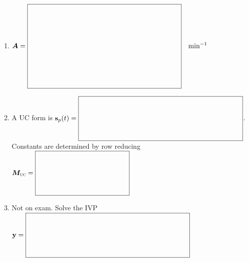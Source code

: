 \documentclass[11pt,letterpaper]{article}
\newcommand{\mat}[1]{\bm{#1}}
\newcommand{\SystemBlank}[2]{%
  \vcenter{\hbox{$\boxed{\rule{0pt}{#2}\makebox[#1]{}}$}}}
\newcommand{\VectorBlank}{\SystemBlank{3.2in}{0.80in}}
\newcommand{\MatrixBlank}{\SystemBlank{1.8in}{0.80in}}
\newcommand{\TrigMatrixBlank}{\SystemBlank{3.0in}{1.60in}}
\begin{document}
\begin{enumerate}
\begin{enumerate}
\noindent $\vect{v}(t)=\vcenter{\hbox{$\boxed{\parbox[c][0.80in][c]{1.6in}{\centering$\begin{pmatrix}50\\60\\40\end{pmatrix}$}}$}}\quad\mathrm{L}\qquad
\vect{b}=\SystemBlank{1.6in}{0.80in}\quad\mathrm{g/min}$
\item $\mat{A}=\TrigMatrixBlank\quad\mathrm{min}^{-1}$
\item A UC form is $\vect{s}_p(t)=\VectorBlank$. 
Constants are determined by row reducing
$\mat{M}_{\text{\textsc{uc}}}=\MatrixBlank$

\item Not on exam. Solve the IVP
$\vect{y} =\VectorBlank$
\end{enumerate}
\end{enumerate}
\end{document}
